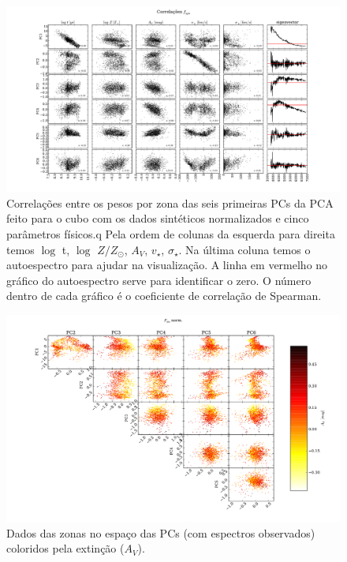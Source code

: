 \begin{figure}
    \includegraphics[width=1.3\textwidth, angle=-90]{figuras/K0277-correl-f_syn_norm-PCvsPhys.pdf}
	\caption[Correlações PCs vs. par\^ametros f\'isicos - $F_{syn}$ norm.]
    {Correlações entre os pesos por zona das seis primeiras PCs da PCA feito para o cubo com os dados sintéticos
    normalizados e cinco parâmetros físicos.q Pela ordem de colunas da esquerda para direita temos $\log$ t, $\log$ $Z /
    Z_{\odot}$, $A_V$, $v_{\star}$, $\sigma_{\star}$. Na última coluna temos o autoespectro para ajudar na visualização.
    A linha em vermelho no gráfico do autoespectro serve para identificar o zero. O número dentro de cada gráfico é o
    coeficiente de correlação de Spearman.}
    \label{fig:K0277correfsynorm}
\end{figure}

\begin{figure}
	\includegraphics[width=1.4\textwidth, angle=-90]{figuras/K0277-f_obs_norm-corre_PCxPC_AV.pdf}
	\caption[Dados no espaço das PCs vs AV- $F_{obs}$ norm.]
    {Dados das zonas no espaço das PCs (com espectros observados) coloridos pela extinção ($A_V$).}
    \label{fig:K0277correfobsnormPCvsPC:AV}	
\end{figure}

